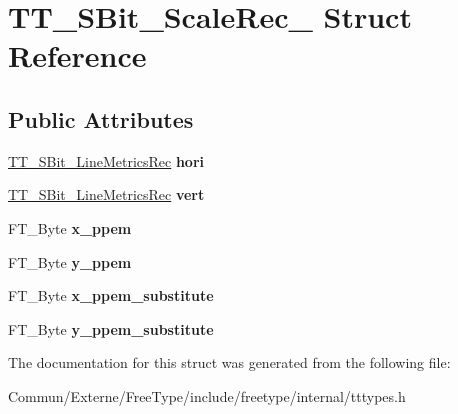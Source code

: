 \hypertarget{struct_t_t___s_bit___scale_rec__}{}\section{T\+T\+\_\+\+S\+Bit\+\_\+\+Scale\+Rec\+\_\+ Struct Reference}
\label{struct_t_t___s_bit___scale_rec__}
\subsection*{Public Attributes}
\begin{DoxyCompactItemize}
\item 
\hyperlink{struct_t_t___s_bit___line_metrics_rec__}{T\+T\+\_\+\+S\+Bit\+\_\+\+Line\+Metrics\+Rec} {\bfseries hori}\hypertarget{struct_t_t___s_bit___scale_rec___a2a61bc97ebb7ed996170a03612ffbbc0}{}\label{struct_t_t___s_bit___scale_rec___a2a61bc97ebb7ed996170a03612ffbbc0}

\item 
\hyperlink{struct_t_t___s_bit___line_metrics_rec__}{T\+T\+\_\+\+S\+Bit\+\_\+\+Line\+Metrics\+Rec} {\bfseries vert}\hypertarget{struct_t_t___s_bit___scale_rec___acbf5c459602d9f52ac04a914e2f12375}{}\label{struct_t_t___s_bit___scale_rec___acbf5c459602d9f52ac04a914e2f12375}

\item 
F\+T\+\_\+\+Byte {\bfseries x\+\_\+ppem}\hypertarget{struct_t_t___s_bit___scale_rec___a235731b0452ea063cccacd2f59b3f44c}{}\label{struct_t_t___s_bit___scale_rec___a235731b0452ea063cccacd2f59b3f44c}

\item 
F\+T\+\_\+\+Byte {\bfseries y\+\_\+ppem}\hypertarget{struct_t_t___s_bit___scale_rec___aa4c1fb419ea55c8c587ba81700c6ce66}{}\label{struct_t_t___s_bit___scale_rec___aa4c1fb419ea55c8c587ba81700c6ce66}

\item 
F\+T\+\_\+\+Byte {\bfseries x\+\_\+ppem\+\_\+substitute}\hypertarget{struct_t_t___s_bit___scale_rec___a71955e363b0b5da84ed2c15d0e6f832d}{}\label{struct_t_t___s_bit___scale_rec___a71955e363b0b5da84ed2c15d0e6f832d}

\item 
F\+T\+\_\+\+Byte {\bfseries y\+\_\+ppem\+\_\+substitute}\hypertarget{struct_t_t___s_bit___scale_rec___a3a9f554d0153f9e3022898c1f59a7b63}{}\label{struct_t_t___s_bit___scale_rec___a3a9f554d0153f9e3022898c1f59a7b63}

\end{DoxyCompactItemize}


The documentation for this struct was generated from the following file\+:\begin{DoxyCompactItemize}
\item 
Commun/\+Externe/\+Free\+Type/include/freetype/internal/tttypes.\+h\end{DoxyCompactItemize}
